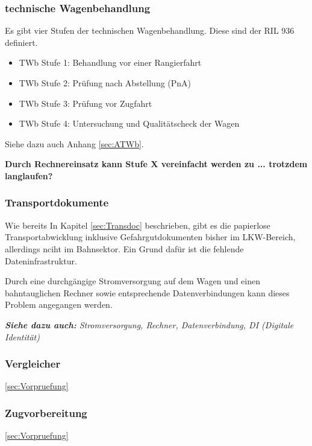\subsubsection{technische Wagenbehandlung}
Es gibt vier Stufen der technischen Wagenbehandlung. Diese sind der RIL 936 definiert.
\begin{itemize}
    \item TWb Stufe 1: Behandlung vor einer Rangierfahrt
    \item TWb Stufe 2: Prüfung nach Abstellung (PnA)
    \item TWb Stufe 3: Prüfung vor Zugfahrt
    \item TWb Stufe 4: Untersuchung und Qualitätscheck der Wagen
\end{itemize}
Siehe dazu auch Anhang \ref{sec:ATWb}.\par
\textbf{Durch Rechnereinsatz kann Stufe X vereinfacht werden zu ... trotzdem langlaufen?}
\subsubsection{Transportdokumente}
Wie bereits In Kapitel \ref{sec:Transdoc} beschrieben, gibt es die papierlose Transportabwicklung inklusive Gefahrgutdokumenten bisher im LKW-Bereich, allerdings nciht im Bahnsektor. Ein Grund dafür ist die fehlende Dateninfrastruktur.\par
Durch eine durchgängige Stromversorgung auf dem Wagen und einen bahntauglichen Rechner sowie entsprechende Datenverbindungen kann dieses Problem angegangen werden.\par
\textit{\textbf{Siehe dazu auch:} Stromversorgung, Rechner, Datenverbindung, DI (Digitale Identität)}
\subsubsection{Vergleicher}
\ref{sec:Vorpruefung}
\subsubsection{Zugvorbereitung}
\ref{sec:Vorpruefung}